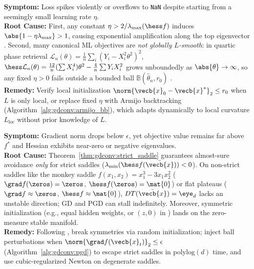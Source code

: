 \documentclass[../../../../master.tex]{subfiles}
\begin{document}
\begin{pitfall}[Pitfall 2: Instability Beyond $\eta = 2/L$ \& Breakdown of Global Smoothness]
\textbf{Symptom:} Loss spikes violently or overflows to \texttt{NaN} despite starting from a seemingly small learning rate $\eta$. \\
\textbf{Root Cause:} First, any constant $\eta > 2/\lambda_{\max}(\hess f)$ induces $\abs{1 - \eta\lambda_{\max}} > 1$, causing exponential amplification along the top eigenvector  . Second, many canonical ML objectives are \emph{not globally $L$-smooth}: in quartic phase retrieval $\mathcal{L}_n(\theta) = \frac{1}{n}\sum_i (Y_i - X_i^2\theta^2)^2$, $\hess \mathcal{L}_n(\theta) = \frac{12}{n}(\sum X_i^4)\theta^2 - \frac{4}{n}\sum Y_i X_i^2$ grows unboundedly as $\abs{\theta} \to \infty$, so any fixed $\eta > 0$ fails outside a bounded ball $\mathbb{B}(\hat{\theta}_n, r_0)$ . \\
\textbf{Remedy:} Verify local initialization $\norm{\vecb{x}_0 - \vecb{x}^*}_2 \le r_0$ when $L$ is only local, or replace fixed $\eta$ with Armijo backtracking (Algorithm~\ref{alg:gdconv:armijo_bb}), which adapts dynamically to local curvature $L_{\mathrm{loc}}$ without prior knowledge of $L$.
\end{pitfall}

\begin{pitfall}
\textbf{Symptom:} Gradient norm drops below $\epsilon$, yet objective value remains far above $f^*$ and Hessian exhibits near-zero or negative eigenvalues. \\
\textbf{Root Cause:} Theorem~\ref{thm:gdconv:strict_saddle} guarantees almost-sure avoidance \emph{only} for strict saddles ($\lambda_{\min}(\hess f(\bar{\vecb{x}})) < 0$). On non-strict saddles like the monkey saddle $f(x_1,x_2) = x_1^3 - 3x_1x_2^2$ ($\grad f(\zeros)=\zeros$, $\hess f(\zeros)=\mat{0}$) or flat plateaus ($\grad f \approx \zeros$, $\hess f \approx \mat{0}$), $DT(\bar{\vecb{x}}) = \eye_d$ lacks an unstable direction; GD and PGD can stall indefinitely. Moreover, symmetric initialization (e.g., equal hidden weights, or $(z, 0)$ in ) lands on the zero-measure stable manifold. \\
\textbf{Remedy:} Following , break symmetries via random initialization; inject ball perturbations when $\norm{\grad f(\vecb{x}_t)}_2 \le \epsilon$ (Algorithm~\ref{alg:gdconv:pgd}) to escape strict saddles in polylog$(d)$ time, and use cubic-regularized Newton on degenerate saddles.
\end{pitfall}
\end{document}
